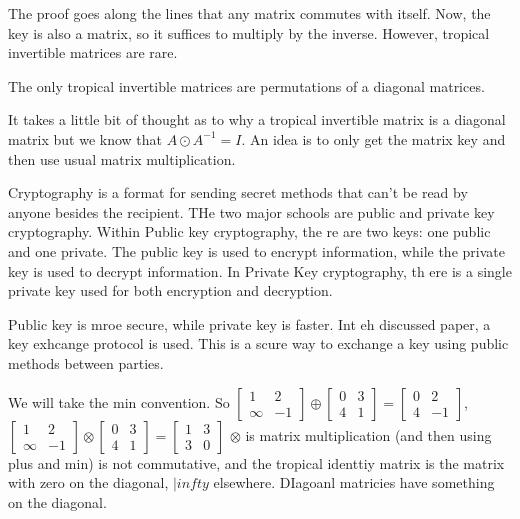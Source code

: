 \documentclass[12pt]{memoir}
\theoremstyle{definition}
\begin{document}
The proof goes along the lines that any matrix commutes with itself. Now, the key is also a matrix, so it suffices to multiply by the inverse. However, tropical invertible matrices are rare. 

\begin{Prop}
The only tropical invertible matrices are permutations of a diagonal matrices.
\end{Prop}

It takes a little bit of thought as to why a tropical invertible matrix is a diagonal matrix but we know that $A\odot A^{-1}=I$.  An idea is to only get the matrix key and then use usual matrix multiplication.



Cryptography is a format for sending secret methods that can't be read by anyone besides the recipient. THe two major schools are public and private key cryptography. Within Public key cryptography, the re are two keys: one public and one private. The public key is used to encrypt information, while the private key is used to decrypt information. In Private Key cryptography, th ere is a single private key used for both encryption and decryption.

Public key is mroe secure, while private key is faster. Int eh discussed paper, a key exhcange protocol is used. This is a scure way to exchange a key using public methods between parties.


We will take the min convention. So $\begin{bmatrix}
    1 & 2 \\ \infty & -1
\end{bmatrix}\oplus \begin{bmatrix}
    0 & 3 \\ 4 & 1
\end{bmatrix}= \begin{bmatrix}
    0 & 2 \\ 4 & -1
\end{bmatrix}$, $\begin{bmatrix}
    1 & 2 \\ \infty & -1
\end{bmatrix}\otimes \begin{bmatrix}
    0 & 3 \\ 4 & 1
\end{bmatrix}= \begin{bmatrix}
    1 & 3 \\ 3 & 0
\end{bmatrix}$ $\otimes$ is matrix multiplication (and then using plus and min) is not commutative, and the tropical identtiy matrix is the matrix with zero on the diagonal, $|infty$ elsewhere. DIagoanl matricies have something on the diagonal.
\end{document}
